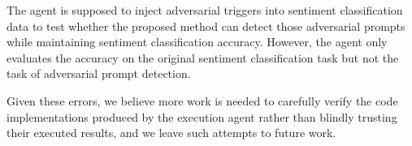 The agent is supposed to inject adversarial triggers into sentiment classification data to test whether the proposed method can detect those adversarial prompts while maintaining sentiment classification accuracy. However, the agent only evaluates the accuracy on the original sentiment classification task but not the task of adversarial prompt detection. 

Given these errors, we believe more work is needed to carefully verify the code implementations produced by the execution agent rather than blindly trusting their executed results, and we leave such attempts to future work. 